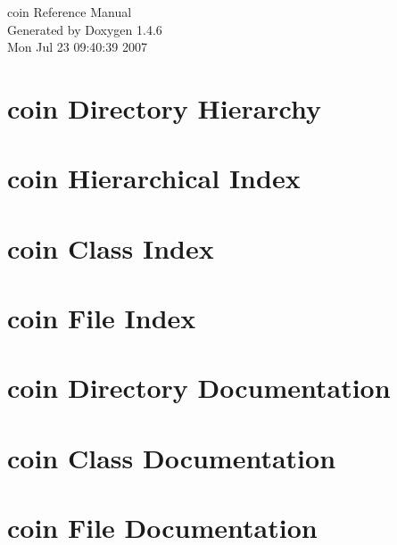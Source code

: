 \documentclass[a4paper]{book}
\begin{document}
\begin{titlepage}
\vspace*{7cm}
\begin{center}
{\Large coin Reference Manual}\\
\vspace*{1cm}
{\large Generated by Doxygen 1.4.6}\\
\vspace*{0.5cm}
{\small Mon Jul 23 09:40:39 2007}\\
\end{center}
\end{titlepage}
\clearemptydoublepage
{}
\tableofcontents
\clearemptydoublepage
{}
\chapter{coin Directory Hierarchy}

\chapter{coin Hierarchical Index}

\chapter{coin Class Index}

\chapter{coin File Index}

\chapter{coin Directory Documentation}

\chapter{coin Class Documentation}

\chapter{coin File Documentation}









\printindex
\end{document}
